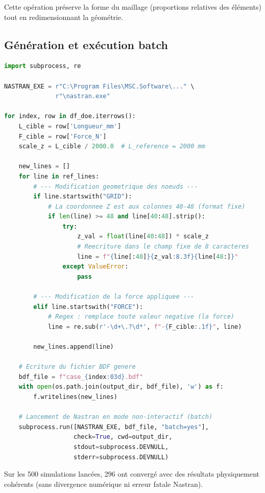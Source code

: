 \documentclass[journal, a4paper, twocolumn]{IEEEtran}
\begin{document}
Cette opération préserve la forme du maillage (proportions relatives des éléments) tout en redimensionnant la géométrie.

\subsection{Génération et exécution batch}

\begin{lstlisting}[language=Python, caption=Modification topologique des noeuds HEXA20 et lancement Nastran en batch]
import subprocess, re

NASTRAN_EXE = r"C:\Program Files\MSC.Software\..." \
              r"\nastran.exe"

for index, row in df_doe.iterrows():
    L_cible = row['Longueur_mm']
    F_cible = row['Force_N']
    scale_z = L_cible / 2000.0  # L_reference = 2000 mm

    new_lines = []
    for line in ref_lines:
        # --- Modification geometrique des noeuds ---
        if line.startswith("GRID"):
            # La coordonnee Z est aux colonnes 40-48 (format fixe)
            if len(line) >= 48 and line[40:48].strip():
                try:
                    z_val = float(line[40:48]) * scale_z
                    # Reecriture dans le champ fixe de 8 caracteres
                    line = f"{line[:40]}{z_val:8.3f}{line[48:]}"
                except ValueError:
                    pass

        # --- Modification de la force appliquee ---
        elif line.startswith("FORCE"):
            # Regex : remplace toute valeur negative (la force)
            line = re.sub(r'-\d+\.?\d*', f"-{F_cible:.1f}", line)

        new_lines.append(line)

    # Ecriture du fichier BDF genere
    bdf_file = f"case_{index:03d}.bdf"
    with open(os.path.join(output_dir, bdf_file), 'w') as f:
        f.writelines(new_lines)

    # Lancement de Nastran en mode non-interactif (batch)
    subprocess.run([NASTRAN_EXE, bdf_file, "batch=yes"],
                   check=True, cwd=output_dir,
                   stdout=subprocess.DEVNULL,
                   stderr=subprocess.DEVNULL)
\end{lstlisting}

Sur les 500 simulations lancées, 296 ont convergé avec des résultats physiquement cohérents (sans divergence numérique ni erreur fatale Nastran).
\end{document}
